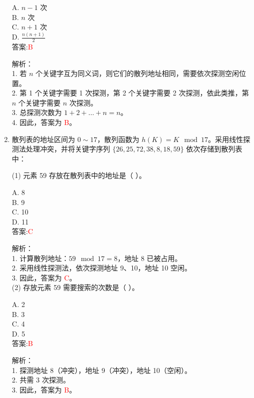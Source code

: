 \documentclass[lang=cn,newtx,10pt,scheme=chinese]{../../../elegantbook}
\begin{document}
\begin{enumerate}
    A. $n-1$ 次 \\  
    B. $n$ 次 \\  
    C. $n+1$ 次 \\  
    D. $\frac{n(n+1)}{2}$ \\  

    答案:\textcolor{red}{B}

    解析：\\
    1. 若 $n$ 个关键字互为同义词，则它们的散列地址相同，需要依次探测空闲位置。\\
    2. 第 1 个关键字需要 1 次探测，第 2 个关键字需要 2 次探测，依此类推，第 $n$ 个关键字需要 $n$ 次探测。\\
    3. 总探测次数为 $1 + 2 + \dots + n = n$。\\
    4. 因此，答案为 \textcolor{red}{B}。\\

\item 散列表的地址区间为 $0 \sim 17$，散列函数为 $h(K) = K \mod 17$。采用线性探测法处理冲突，并将关键字序列 $\{26, 25, 72, 38, 8, 18, 59\}$ 依次存储到散列表中：  

    (1) 元素 59 存放在散列表中的地址是（ ）。  

    A. 8 \\  
    B. 9 \\  
    C. 10 \\  
    D. 11 \\  

    答案:\textcolor{red}{C}

    解析：\\
    1. 计算散列地址：$59 \mod 17 = 8$，地址 8 已被占用。\\
    2. 采用线性探测法，依次探测地址 9、10，地址 10 空闲。\\
    3. 因此，答案为 \textcolor{red}{C}。\\

    (2) 存放元素 59 需要搜索的次数是（ ）。  

    A. 2 \\  
    B. 3 \\  
    C. 4 \\  
    D. 5 \\  

    答案:\textcolor{red}{B}

    解析：\\
    1. 探测地址 8（冲突），地址 9（冲突），地址 10（空闲）。\\
    2. 共需 3 次探测。\\
    3. 因此，答案为 \textcolor{red}{B}。\\


\end{enumerate}
\end{document}
